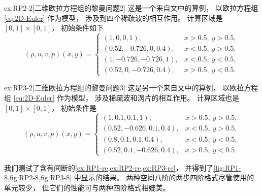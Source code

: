 \begin{exampleRe}{ex:RP2}{-2}[二维欧拉方程组的黎曼问题2]
  \label{ex:RP2-re}
  这是一个来自文\cite{RPexample}中的算例，
  以欧拉方程组 \cref{eq:2D-Euler} 作为模型，
  涉及到四个稀疏波的相互作用。
  计算区域是$[0,1]\times[0,1]$，
  初始条件如下
  \begin{equation}
    (\rho, u, v, p) (x, y)=
    \begin{cases}
      (1, 0, 0, 1),           & x>0.5,~y>0.5,  \\
      (0.52, -0.726, 0, 0.4), & x<0.5,~y>0.5,  \\
      (1, -0.726, -0.726, 1), & x<0.5,~y<0.5,  \\
      (0.52, 0, -0.726, 0.4), & x>0.5,~y<0.5.
    \end{cases}
  \end{equation}
\end{exampleRe}

\begin{exampleRe}{ex:RP3}{-2}[二维欧拉方程组的黎曼问题3]
  \label{ex:RP3-re}
  这是另一个来自文\cite{RPexample}中的算例，
  以欧拉方程组 \cref{eq:2D-Euler} 作为模型，
  涉及稀疏波和涡片的相互作用。
  计算区域也是$[0,1]\times[0,1]$，
  初始条件是
  \begin{equation}
    (\rho, u, v, p) (x, y)=
    \begin{cases}
      (1, 0.1, 0.1, 1),         & x>0.5,~y>0.5,  \\
      (0.52, -0.626, 0.1, 0.4), & x<0.5,~y>0.5,  \\
      (0.8, 0.1, 0.1, 0.4),     & x<0.5,~y<0.5,  \\
      (0.52, 0.1, -0.626, 0.4), & x>0.5,~y<0.5.
    \end{cases}
  \end{equation}
\end{exampleRe}

我们测试了含有间断的\cref{ex:RP1-re,ex:RP2-re,ex:RP3-re}，
并得到了\cref{fig:RP1-8,fig:RP2-8,fig:RP3-8} 中显示的结果。
两种空间八阶的两步四阶格式尽管使用的单元较少，
但它们的性能可与两种四阶格式相媲美。

